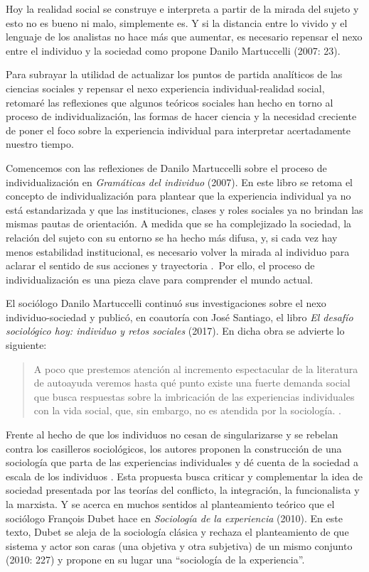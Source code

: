 \documentclass[
  spanish,
  11pt,
  a4paper,
]{scrbook}
\begin{document}
Hoy la realidad social se construye e interpreta a partir de la mirada
del sujeto y esto no es bueno ni malo, simplemente es. Y si la distancia
entre lo vivido y el lenguaje de los analistas no hace más que aumentar,
es necesario repensar el nexo entre el individuo y la sociedad como
propone Danilo Martuccelli (2007: 23).

Para subrayar la utilidad de actualizar los puntos de partida analíticos
de las ciencias sociales y repensar el nexo experiencia
individual-realidad social, retomaré las reflexiones que algunos
teóricos sociales han hecho en torno al proceso de individualización,
las formas de hacer ciencia y la necesidad creciente de poner el foco
sobre la experiencia individual para interpretar acertadamente nuestro
tiempo.

Comencemos con las reflexiones de Danilo Martuccelli sobre el proceso de
individualización en \emph{Gramáticas del individuo} (2007). En este
libro se retoma el concepto de individualización para plantear que la
experiencia individual ya no está estandarizada y que las instituciones,
clases y roles sociales ya no brindan las mismas pautas de orientación.
A medida que se ha complejizado la sociedad, la relación del sujeto con
su entorno se ha hecho más difusa, y, si cada vez hay menos estabilidad
institucional, es necesario volver la mirada al individuo para aclarar
el sentido de sus acciones y trayectoria
\autocite[24]{Martuccelli2007a}.~Por ello, el proceso de
individualización es una pieza clave para comprender el mundo actual.

El sociólogo Danilo Martuccelli continuó sus investigaciones sobre el
nexo individuo-sociedad y publicó, en coautoría con José Santiago, el
libro \emph{El desafío sociológico hoy: individuo y retos sociales}
(2017). En dicha obra se advierte lo siguiente:

\begin{quote}
A poco que prestemos atención al incremento espectacular de la
literatura de autoayuda veremos hasta qué punto existe una fuerte
demanda social que busca respuestas sobre la imbricación de las
experiencias individuales con la vida social, que, sin embargo, no es
atendida por la sociología. \autocite[7]{Martuccelli2017}.
\end{quote}

Frente al hecho de que los individuos no cesan de singularizarse y se
rebelan contra los casilleros sociológicos, los autores proponen la
construcción de una sociología que parta de las experiencias
individuales y dé cuenta de la sociedad a escala de los individuos
\autocite[8-9]{Martuccelli2017}. Esta propuesta busca criticar y
complementar la idea de sociedad presentada por las teorías del
conflicto, la integración, la funcionalista y la marxista. Y se acerca
en muchos sentidos al planteamiento teórico que el sociólogo François
Dubet hace en \emph{Sociología de la experiencia} (2010). En este texto,
Dubet se aleja de la sociología clásica y rechaza el planteamiento de
que sistema y actor son caras (una objetiva y otra subjetiva) de un
mismo conjunto (2010: 227) y propone en su lugar una ``sociología de la
experiencia''.
\end{document}
